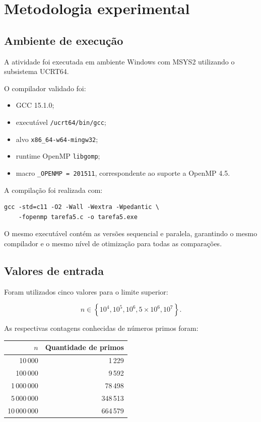\section{Metodologia experimental}
\label{sec:atvd05-metodologia}

\subsection{Ambiente de execução}

A atividade foi executada em ambiente Windows com MSYS2 utilizando o
subsistema UCRT64.

O compilador validado foi:

\begin{itemize}
    \item GCC 15.1.0;
    \item executável \texttt{/ucrt64/bin/gcc};
    \item alvo \texttt{x86\_64-w64-mingw32};
    \item runtime OpenMP \texttt{libgomp};
    \item macro \texttt{\_OPENMP = 201511}, correspondente ao suporte
    a OpenMP 4.5.
\end{itemize}

A compilação foi realizada com:

\begin{verbatim}
gcc -std=c11 -O2 -Wall -Wextra -Wpedantic \
    -fopenmp tarefa5.c -o tarefa5.exe
\end{verbatim}

O mesmo executável contém as versões sequencial e paralela, garantindo o
mesmo compilador e o mesmo nível de otimização para todas as comparações.


\subsection{Valores de entrada}

Foram utilizados cinco valores para o limite superior:

\[
n \in
\left\{
10^4,
10^5,
10^6,
5\times10^6,
10^7
\right\}.
\]

As respectivas contagens conhecidas de números primos foram:

\begin{center}
\begin{tabular}{|r|r|}
\hline
\textbf{\(n\)} & \textbf{Quantidade de primos} \\
\hline
10\,000 & 1\,229 \\
100\,000 & 9\,592 \\
1\,000\,000 & 78\,498 \\
5\,000\,000 & 348\,513 \\
10\,000\,000 & 664\,579 \\
\hline
\end{tabular}
\end{center}


